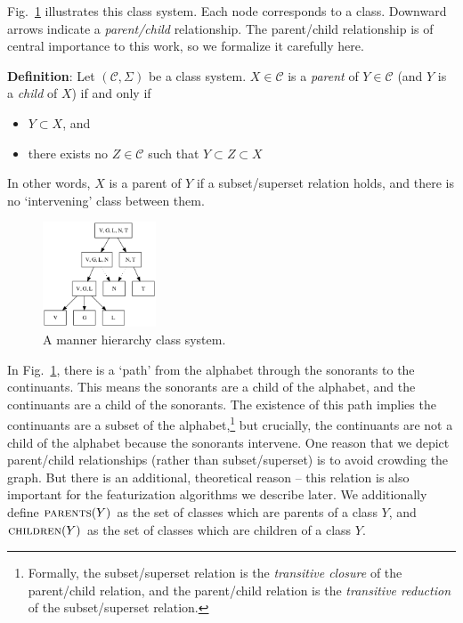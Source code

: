 \documentclass[11pt, oneside]{article}   	%
\begin{document}
\noindent Fig.~\ref{fig:manner_input} illustrates this class system. Each node corresponds to a class. Downward arrows indicate a \textit{parent/child} relationship. The parent/child relationship is of central importance to this work, so we formalize it carefully here.

\vspace{\baselineskip} \noindent \textbf{Definition}: Let $(\mathcal C, \Sigma)$ be a class system. $X \in \mathcal C$ is a \textit{parent} of $Y \in \mathcal C$ (and $Y$ is a \textit{child} of $X$) if and only if \begin{itemize}
    \item $Y \subset X$, and
    \item there exists no $Z \in \mathcal C$ such that $Y \subset Z \subset X$
    \end{itemize}
In other words, $X$ is a parent of $Y$ if a subset/superset relation holds, and there is no `intervening' class between them. 

\begin{figure}[htb!]
	\centering
	\includegraphics[width=0.3\textwidth]{manner_poset_privative.png}
	\caption{A manner hierarchy class system.}
	\label{fig:manner_input}
\end{figure}

In Fig.~\ref{fig:manner_input}, there is a `path' from the alphabet through the sonorants to the continuants. This means the sonorants are a child of the alphabet, and the continuants are a child of the sonorants. The existence of this path implies the continuants are a subset of the alphabet,\footnote{Formally, the subset/superset relation is the \textit{transitive closure} of the parent/child relation, and the parent/child relation is the \textit{transitive reduction} of the subset/superset relation.} but crucially, the continuants are not a child of the alphabet because the sonorants intervene. One reason that we depict  parent/child relationships (rather than subset/superset) is to avoid crowding the graph. But there is an additional, theoretical reason -- this relation is also important for the featurization algorithms we describe later. We additionally define $\textsc{parents}(Y)$ as the set of classes which are parents of a class $Y$, and $\textsc{children}(Y)$ as the set of classes which are children of a class $Y$.
\end{document}
